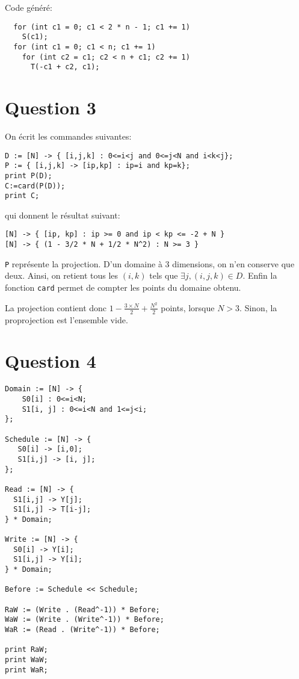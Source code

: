 \documentclass{article}
\begin{document}
Code généré:
\begin{lstlisting}
  for (int c1 = 0; c1 < 2 * n - 1; c1 += 1)
    S(c1);
  for (int c1 = 0; c1 < n; c1 += 1)
    for (int c2 = c1; c2 < n + c1; c2 += 1)
      T(-c1 + c2, c1);
\end{lstlisting}

\section*{Question 3}

On écrit les commandes suivantes:
\begin{lstlisting}
D := [N] -> { [i,j,k] : 0<=i<j and 0<=j<N and i<k<j};
P := { [i,j,k] -> [ip,kp] : ip=i and kp=k};
print P(D);
C:=card(P(D));
print C;
\end{lstlisting}

qui donnent le résultat suivant:
\begin{lstlisting}
[N] -> { [ip, kp] : ip >= 0 and ip < kp <= -2 + N }
[N] -> { (1 - 3/2 * N + 1/2 * N^2) : N >= 3 }
\end{lstlisting}

\lstinline{P} représente la projection.
D'un domaine à 3 dimensions, on n'en conserve que deux.
Ainsi, on retient tous les $(i,k)$ tels que $\exists j, (i,j,k)\in D$.
Enfin la fonction \lstinline{card} permet de compter les points du domaine obtenu.

La projection contient donc $1-\frac{3\times N}{2} + \frac{N^2}{2}$ points, lorsque $N>3$. Sinon, la proprojection est l'ensemble vide.


\section*{Question 4}

\begin{lstlisting}
Domain := [N] -> {
    S0[i] : 0<=i<N;
    S1[i, j] : 0<=i<N and 1<=j<i;
};

Schedule := [N] -> {
   S0[i] -> [i,0];
   S1[i,j] -> [i, j];
};

Read := [N] -> {
  S1[i,j] -> Y[j];
  S1[i,j] -> T[i-j];
} * Domain;

Write := [N] -> {
  S0[i] -> Y[i];
  S1[i,j] -> Y[i];
} * Domain;

Before := Schedule << Schedule;

RaW := (Write . (Read^-1)) * Before;
WaW := (Write . (Write^-1)) * Before;
WaR := (Read . (Write^-1)) * Before;

print RaW;
print WaW;
print WaR;
\end{lstlisting}
\end{document}

